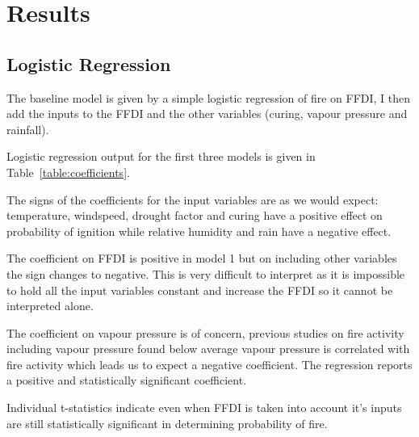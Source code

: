 \documentclass[11pt,a4paper]{article}
\begin{document}


\section{Results}

\subsection{Logistic Regression}

The baseline model is given by a simple logistic regression of fire on FFDI, I then add the inputs to the FFDI and  the other variables (curing, vapour pressure and rainfall).

Logistic regression output for the first three models is given in Table~\ref{table:coefficients}.

The signs of the coefficients for the input variables are as we would expect: temperature, windspeed, drought factor and curing have a positive effect on probability of ignition while relative humidity and rain have a negative effect.


The coefficient on FFDI is positive in model 1 but on including other variables the  sign changes to negative. This is very difficult to interpret as it is impossible to hold all the input  variables constant and increase the FFDI so it cannot be interpreted alone.

The coefficient on vapour pressure is of concern, previous studies on fire activity including vapour pressure \citep{harris14} found below average vapour pressure is correlated with fire activity which leads us to expect a negative coefficient. The regression reports a positive and statistically significant coefficient.

Individual t-statistics indicate even when FFDI is taken into account it's inputs are still statistically significant in determining probability of fire.
\end{document}
